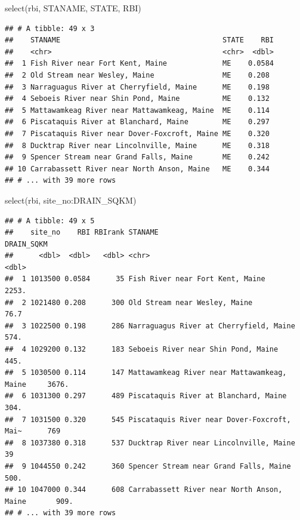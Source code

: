 \documentclass[
]{book}
\newenvironment{Shaded}{\begin{snugshade}}{\end{snugshade}}
\newcommand{\FunctionTok}[1]{\textcolor[rgb]{0.00,0.00,0.00}{#1}}
\newcommand{\NormalTok}[1]{#1}
\newcommand{\SpecialCharTok}[1]{\textcolor[rgb]{0.00,0.00,0.00}{#1}}
\begin{document}
\begin{Shaded}
\begin{Highlighting}[]
\FunctionTok{select}\NormalTok{(rbi, STANAME, STATE, RBI)}
\end{Highlighting}
\end{Shaded}

\begin{verbatim}
## # A tibble: 49 x 3
##    STANAME                                      STATE    RBI
##    <chr>                                        <chr>  <dbl>
##  1 Fish River near Fort Kent, Maine             ME    0.0584
##  2 Old Stream near Wesley, Maine                ME    0.208 
##  3 Narraguagus River at Cherryfield, Maine      ME    0.198 
##  4 Seboeis River near Shin Pond, Maine          ME    0.132 
##  5 Mattawamkeag River near Mattawamkeag, Maine  ME    0.114 
##  6 Piscataquis River at Blanchard, Maine        ME    0.297 
##  7 Piscataquis River near Dover-Foxcroft, Maine ME    0.320 
##  8 Ducktrap River near Lincolnville, Maine      ME    0.318 
##  9 Spencer Stream near Grand Falls, Maine       ME    0.242 
## 10 Carrabassett River near North Anson, Maine   ME    0.344 
## # ... with 39 more rows
\end{verbatim}

\begin{Shaded}
\begin{Highlighting}[]
\FunctionTok{select}\NormalTok{(rbi, site\_no}\SpecialCharTok{:}\NormalTok{DRAIN\_SQKM)}
\end{Highlighting}
\end{Shaded}

\begin{verbatim}
## # A tibble: 49 x 5
##    site_no    RBI RBIrank STANAME                                     DRAIN_SQKM
##      <dbl>  <dbl>   <dbl> <chr>                                            <dbl>
##  1 1013500 0.0584      35 Fish River near Fort Kent, Maine                2253. 
##  2 1021480 0.208      300 Old Stream near Wesley, Maine                     76.7
##  3 1022500 0.198      286 Narraguagus River at Cherryfield, Maine          574. 
##  4 1029200 0.132      183 Seboeis River near Shin Pond, Maine              445. 
##  5 1030500 0.114      147 Mattawamkeag River near Mattawamkeag, Maine     3676. 
##  6 1031300 0.297      489 Piscataquis River at Blanchard, Maine            304. 
##  7 1031500 0.320      545 Piscataquis River near Dover-Foxcroft, Mai~      769  
##  8 1037380 0.318      537 Ducktrap River near Lincolnville, Maine           39  
##  9 1044550 0.242      360 Spencer Stream near Grand Falls, Maine           500. 
## 10 1047000 0.344      608 Carrabassett River near North Anson, Maine       909. 
## # ... with 39 more rows
\end{verbatim}
\end{document}

